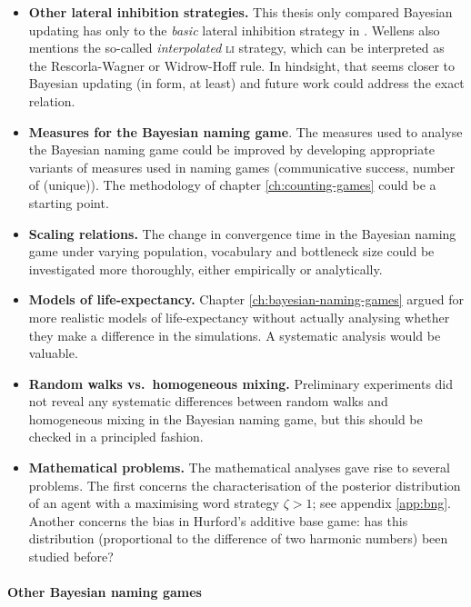 \documentclass{../src/bcthesispart}
\begin{document}
\begin{itemize}
	\item \textbf{Other lateral inhibition strategies.}
	This thesis only compared Bayesian updating has only to the \emph{basic} lateral inhibition strategy in \textcite{Wellens2012}. 
	Wellens also mentions the so-called \emph{interpolated} \textsc{li} strategy, which can be interpreted as the Rescorla-Wagner or Widrow-Hoff rule. 
	In hindsight, that seems closer to Bayesian updating (in form, at least) and future work could address the exact relation.

	\item \textbf{Measures for the Bayesian naming game}.
	\label{fw:measures-bng}
	The measures used to analyse the Bayesian naming game could be improved by developing appropriate variants of measures used in naming games (communicative success, number of (unique)). 
	The methodology of chapter \ref{ch:counting-games} could be a starting point.
	
	\item \textbf{Scaling relations.}
	The change in convergence time in the Bayesian naming game under varying population, vocabulary and bottleneck size could be investigated more thoroughly, either empirically or analytically.
	
	\item \textbf{Models of life-expectancy.}
	Chapter \ref{ch:bayesian-naming-games} argued for more realistic models of life-expectancy without actually analysing whether they make a difference in the simulations. 
	A systematic analysis would be valuable.
	
	\item \textbf{Random walks vs.~homogeneous mixing.}
	Preliminary experiments did not reveal any systematic differences between random walks and homogeneous mixing in the Bayesian naming game, but this should be checked in a principled fashion.
	
	\item \textbf{Mathematical problems.}
	The mathematical analyses gave rise to several problems.
	The first concerns the characterisation of the posterior distribution of an agent with a maximising word strategy $\zeta > 1$; see appendix \ref{app:bng}.
	Another concerns the bias in Hurford’s additive base game: has this distribution (proportional to the difference of two harmonic numbers) been studied before?
\end{itemize}

\paragraph{Other Bayesian naming games}
\end{document}
